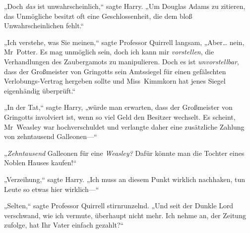 „Doch \emph{das} ist unwahrscheinlich,“ sagte Harry. „Um Douglas Adams zu zitieren, das Unmögliche besitzt oft eine Geschlossenheit, die dem bloß Unwahrscheinlichen fehlt.“

„Ich verstehe, was Sie meinen,“ sagte Professor Quirrell langsam, „Aber… nein, Mr~Potter. Es mag unmöglich sein, doch ich kann mir \emph{vorstellen}, die Verhandlungen des Zaubergamots zu manipulieren. Doch es ist \emph{unvorstellbar}, dass der Großmeister von Gringotts sein Amtssiegel für einen gefälschten Verlobungs-Vertrag hergeben sollte und Miss~Kimmkorn hat jenes Siegel eigenhändig überprüft.“

„In der Tat,“ sagte Harry, „würde man erwarten, dass der Großmeister von Gringotts involviert ist, wenn so viel Geld den Besitzer wechselt. Es scheint, Mr~Weasley war hochverschuldet und verlangte daher eine zusätzliche Zahlung von zehntausend Galleonen—“

„\emph{Zehntausend} Galleonen für eine \emph{Weasley?} Dafür könnte man die Tochter eines Noblen Hauses kaufen!“

„Verzeihung,“ sagte Harry. „Ich muss an diesem Punkt wirklich nachhaken, tun Leute so etwas hier wirklich—“

„Selten,“ sagte Professor Quirrell stirnrunzelnd. „Und seit der Dunkle Lord verschwand, wie ich vermute, überhaupt nicht mehr. Ich nehme an, der Zeitung zufolge, hat Ihr Vater einfach gezahlt?“

